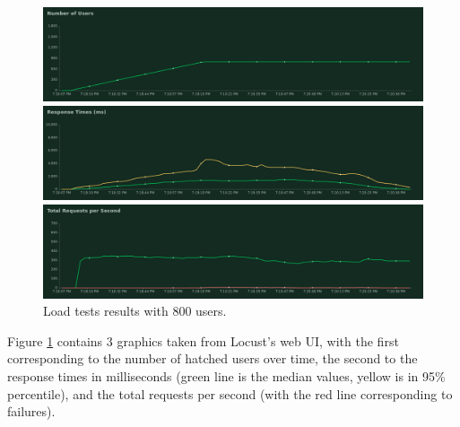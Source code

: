 \documentclass[12pt]{article}
\begin{document}
\begin{figure}[H]
  \centering
  \begin{minipage}{\textwidth}
    \centering
    \includegraphics[width=\linewidth]{tests/local/800/number_of_users_1588097887.png}
  \end{minipage}%
  \label{fig:LocalTests:number_of_users}
  \begin{minipage}{\textwidth}
    \centering
    \includegraphics[width=\linewidth]{tests/local/800/response_times_(ms)_1588097887.png}
  \end{minipage}%
  \label{fig:LocalTests:response_times_(ms)}
  \begin{minipage}{\textwidth}
    \centering
    \includegraphics[width=\linewidth]{tests/local/800/total_requests_per_second_1588097887.png}
  \end{minipage}%
  \caption{Load tests results with 800 users.}
  \label{fig:LocalTests:total_requests_per_second}
\end{figure}
\vspace{-10pt}

Figure \ref{fig:LocalTests:total_requests_per_second} contains 3 graphics taken from Locust's web UI, with the first corresponding to the number of hatched 
users over time, the second to the response times in milliseconds (green line is the median values, yellow is in 95\% percentile), and the total requests per
second (with the red line corresponding to failures).
\end{document}

